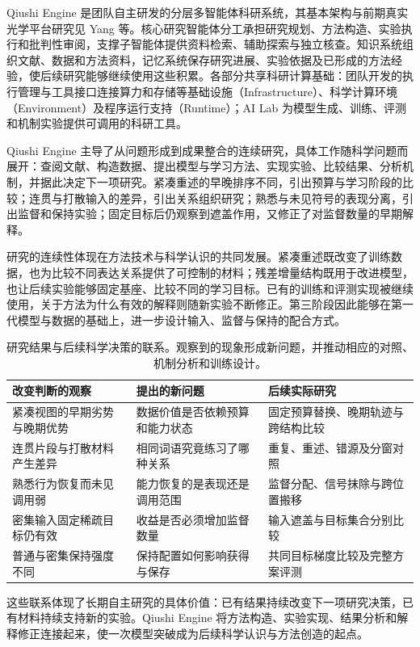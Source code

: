 Qiushi Engine 是团队自主研发的分层多智能体科研系统，其基本架构与前期真实光学平台研究见 Yang 等\citep{yang2026optical}。核心研究智能体分工承担研究规划、方法构造、实验执行和批判性审阅，支撑子智能体提供资料检索、辅助探索与独立核查。知识系统组织文献、数据和方法资料，记忆系统保存研究进展、实验依据及已形成的方法经验，使后续研究能够继续使用这些积累。各部分共享科研计算基础：团队开发的执行管理与工具接口连接算力和存储等基础设施（Infrastructure）、科学计算环境（Environment）及程序运行支持（Runtime）；AI Lab 为模型生成、训练、评测和机制实验提供可调用的科研工具。

Qiushi Engine 主导了从问题形成到成果整合的连续研究，具体工作随科学问题而展开：查阅文献、构造数据、提出模型与学习方法、实现实验、比较结果、分析机制，并据此决定下一项研究。紧凑重述的早晚排序不同，引出预算与学习阶段的比较；连贯与打散输入的差异，引出关系组织研究；熟悉与未见符号的表现分离，引出监督和保持实验；固定目标后仍观察到遮盖作用，又修正了对监督数量的早期解释。

研究的连续性体现在方法技术与科学认识的共同发展。紧凑重述既改变了训练数据，也为比较不同表达关系提供了可控制的材料；残差增量结构既用于改进模型，也让后续实验能够固定基座、比较不同的学习目标。已有的训练和评测实现被继续使用，关于方法为什么有效的解释则随新实验不断修正。第三阶段因此能够在第一代模型与数据的基础上，进一步设计输入、监督与保持的配合方式。

\begin{table}[htbp]
\caption{研究结果与后续科学决策的联系。观察到的现象形成新问题，并推动相应的对照、机制分析和训练设计。}
\label{tab:research_decisions}
\small
\begin{tabularx}{\linewidth}{@{}Y Y Y@{}}
\toprule 改变判断的观察 & 提出的新问题 & 后续实际研究\\\midrule
紧凑视图的早期劣势与晚期优势 & 数据价值是否依赖预算和能力状态 & 固定预算替换、晚期轨迹与跨结构比较\\
连贯片段与打散材料产生差异 & 相同词语究竟练习了哪种关系 & 重复、重述、错源及分窗对照\\
熟悉行为恢复而未见调用弱 & 能力恢复的是表现还是调用范围 & 监督分配、信号抹除与跨位置搬移\\
密集输入固定稀疏目标仍有效 & 收益是否必须增加监督数量 & 输入遮盖与目标集合分别比较\\
普通与密集保持强度不同 & 保持配置如何影响获得与保存 & 共同目标梯度比较及完整方案评测\\
\bottomrule
\end{tabularx}
\end{table}

这些联系体现了长期自主研究的具体价值：已有结果持续改变下一项研究决策，已有材料持续支持新的实验。Qiushi Engine 将方法构造、实验实现、结果分析和解释修正连接起来，使一次模型突破成为后续科学认识与方法创造的起点。

